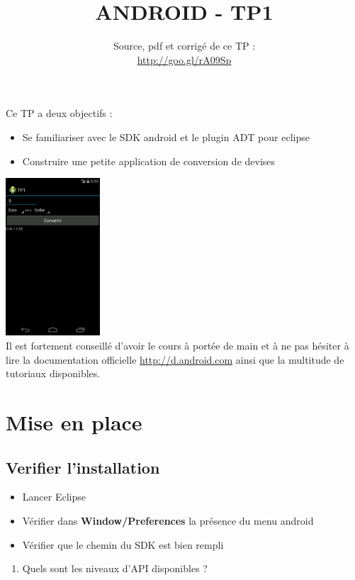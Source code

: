 \documentclass{article}
\title{ANDROID - TP1}
\date{Source, pdf et corrigé de ce TP
:\\\href{http://goo.gl/rA09Sp}{http://goo.gl/rA09Sp}}
\begin{document}
\maketitle
Ce TP a deux objectifs :
\begin{itemize}
\item Se familiariser avec le SDK android et le plugin ADT pour eclipse
\item Construire une petite application de conversion de devises
\end{itemize}
\includegraphics[width=100pt]{img/tp1.png}\\
Il est fortement conseillé d'avoir le cours à portée de main et à ne pas hésiter à lire la documentation officielle
\href{http://d.android.com}{http://d.android.com} ainsi que la multitude de tutoriaux disponibles.
\section{Mise en place}
\subsection{Verifier l'installation}
\begin{itemize}
\item Lancer Eclipse
\item Vérifier dans \textbf{Window/Preferences} la présence du menu android
\item Vérifier que le chemin du SDK est bien rempli
\end{itemize}
\begin{enumerate}
\item Quels sont les niveaux d'API disponibles ?
\end{enumerate}
\end{document}
